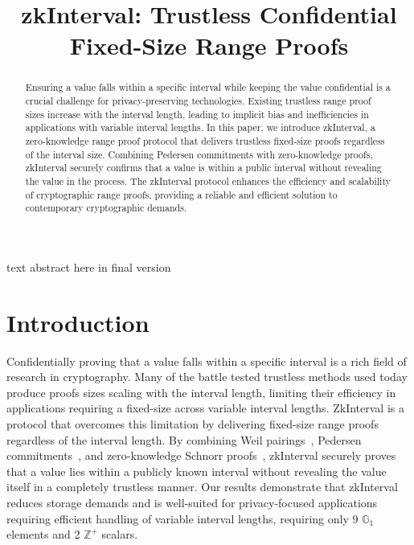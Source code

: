 \documentclass[version=preprint]{iacrcc}
\title[running = {zkInterval},
      ]{zkInterval: Trustless Confidential Fixed-Size Range Proofs}
\begin{document}
\maketitle


\begin{abstract}
  Ensuring a value falls within a specific interval while keeping the value confidential is a crucial challenge for privacy-preserving technologies. Existing trustless range proof sizes increase with the interval length, leading to implicit bias and inefficiencies in applications with variable interval lengths. In this paper, we introduce zkInterval, a zero-knowledge range proof protocol that delivers trustless fixed-size proofs regardless of the interval size. Combining Pedersen commitments with zero-knowledge proofs, zkInterval securely confirms that a value is within a public interval without revealing the value in the process. The zkInterval protocol enhances the efficiency and scalability of cryptographic range proofs, providing a reliable and efficient solution to contemporary cryptographic demands.
\end{abstract}

\begin{textabstract}
  text abstract here in final version
\end{textabstract}

\section{Introduction}

Confidentially proving that a value falls within a specific interval is a rich field of research in cryptography. Many of the battle tested trustless methods used today produce proofs sizes scaling with the interval length, limiting their efficiency in applications requiring a fixed-size across variable interval lengths. ZkInterval is a protocol that overcomes this limitation by delivering fixed-size range proofs regardless of the interval length. By combining Weil pairings~\cite{menezes93}, Pedersen commitments~\cite{pc92}, and zero-knowledge Schnorr proofs~\cite{zero20}, zkInterval securely proves that a value lies within a publicly known interval without revealing the value itself in a completely trustless manner. Our results demonstrate that zkInterval reduces storage demands and is well-suited for privacy-focused applications requiring efficient handling of variable interval lengths, requiring only 9 \( \mathbb{G}_{1} \) elements and 2 \( \mathbb{Z}^+ \) scalars.
\end{document}
